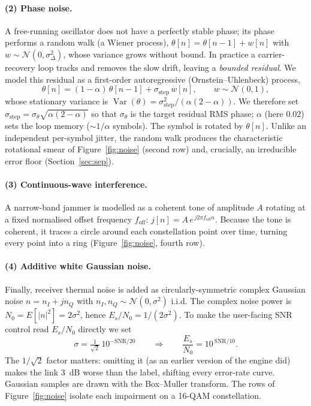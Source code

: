\documentclass[11pt,a4paper,onecolumn,final]{article}
\begin{document}
\paragraph{(2) Phase noise.} A free-running oscillator does not have a perfectly stable
phase; its phase performs a random walk (a Wiener process),
$\theta[n]=\theta[n-1]+w[n]$ with $w\sim\mathcal{N}(0,\sigma_\Delta^2)$, whose variance grows
without bound. In practice a carrier-recovery loop tracks and removes the slow drift, leaving
a \emph{bounded residual}. We model this residual as a first-order autoregressive
(Ornstein--Uhlenbeck) process,
\begin{equation}
\theta[n] = (1-\alpha)\,\theta[n-1] + \sigma_{\text{step}}\,w[n],\qquad w\sim\mathcal{N}(0,1),
\end{equation}
whose stationary variance is $\operatorname{Var}(\theta)=\sigma_{\text{step}}^2/(\alpha(2-\alpha))$.
We therefore set $\sigma_{\text{step}}=\sigma_\theta\sqrt{\alpha(2-\alpha)}$ so that
$\sigma_\theta$ is the target residual RMS phase; $\alpha$ (here $0.02$) sets the loop memory
($\sim 1/\alpha$ symbols). The symbol is rotated by $\theta[n]$. Unlike an independent
per-symbol jitter, the random walk produces the characteristic rotational smear of
Figure~\ref{fig:noise} (second row) and, crucially, an irreducible error floor
(Section~\ref{sec:sep}).

\paragraph{(3) Continuous-wave interference.} A narrow-band jammer is modelled as a coherent
tone of amplitude $A$ rotating at a fixed normalised offset frequency $f_{\text{off}}$:
$j[n] = A\,e^{\,j 2\pi f_{\text{off}} n}$. Because the tone is coherent, it traces a circle
around each constellation point over time, turning every point into a ring
(Figure~\ref{fig:noise}, fourth row).

\paragraph{(4) Additive white Gaussian noise.} Finally, receiver thermal noise is added as
circularly-symmetric complex Gaussian noise $n=n_I+jn_Q$ with $n_I,n_Q\sim\mathcal{N}(0,\sigma^2)$
i.i.d. The complex noise power is $N_0=E[|n|^2]=2\sigma^2$, hence $E_s/N_0 = 1/(2\sigma^2)$.
To make the user-facing SNR control read $E_s/N_0$ directly we set
\begin{equation}
\sigma = \tfrac{1}{\sqrt2}\,10^{-\text{SNR}/20}
\qquad\Longrightarrow\qquad
\frac{E_s}{N_0}=10^{\,\text{SNR}/10}.
\label{eq:sigma}
\end{equation}
The $1/\sqrt2$ factor matters: omitting it (as an earlier version of the engine did) makes
the link $3$~dB worse than the label, shifting every error-rate curve. Gaussian samples are
drawn with the Box--Muller transform. The rows of Figure~\ref{fig:noise} isolate each
impairment on a 16-QAM constellation.
\end{document}
